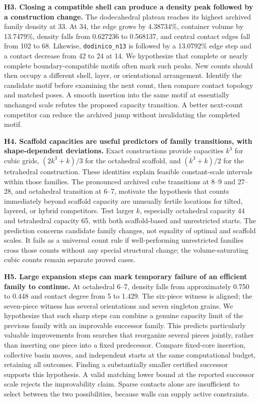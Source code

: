 \documentclass[11pt,a4paper]{article}
\begin{document}
\textbf{H3. Closing a compatible shell can produce a density peak followed by a construction change.} The dodecahedral plateau reaches its highest archived family density at 33. At 34, the edge grows by 4.38734\%, container volume by 13.7479\%, density falls from 0.627236 to 0.568137, and central contact edges fall from 102 to 68. Likewise, \nolinkurl{dodinico_n13} is followed by a 13.0792\% edge step and a contact decrease from 42 to 24 at 14. We hypothesize that complete or nearly complete boundary-compatible motifs often mark such peaks. New counts should then occupy a different shell, layer, or orientational arrangement. Identify the candidate motif before examining the next count, then compare contact topology and matched poses. A smooth insertion into the same motif at essentially unchanged scale refutes the proposed capacity transition. A better next-count competitor can reduce the archived jump without invalidating the completed motif.

\textbf{H4. Scaffold capacities are useful predictors of family transitions, with shape-dependent deviations.} Exact constructions provide capacities $k^3$ for cubic grids, $(2k^3+k)/3$ for the octahedral scaffold, and $(k^3+k)/2$ for the tetrahedral construction. These identities explain feasible constant-scale intervals within those families. The pronounced archived cube transitions at 8--9 and 27--28, and octahedral transition at 6--7, motivate the hypothesis that counts immediately beyond scaffold capacity are unusually fertile locations for tilted, layered, or hybrid competitors. Test larger $k$, especially octahedral capacity 44 and tetrahedral capacity 65, with both scaffold-based and unrestricted starts. The prediction concerns candidate family changes, not equality of optimal and scaffold scales. It fails as a universal count rule if well-performing unrestricted families cross those counts without any special structural change; the volume-saturating cubic counts remain separate proved cases.

\textbf{H5. Large expansion steps can mark temporary failure of an efficient family to continue.} At octahedral 6--7, density falls from approximately 0.750 to 0.448 and contact degree from 5 to 1.429. The six-piece witness is aligned; the seven-piece witness has several orientations and seven singleton grains. We hypothesize that such sharp steps can combine a genuine capacity limit of the previous family with an improvable successor family. This predicts particularly valuable improvements from searches that reorganize several pieces jointly, rather than inserting one piece into a fixed predecessor. Compare fixed-core insertion, collective basin moves, and independent starts at the same computational budget, retaining all outcomes. Finding a substantially smaller certified successor supports this hypothesis. A valid matching lower bound at the reported successor scale rejects the improvability claim. Sparse contacts alone are insufficient to select between the two possibilities, because walls can supply active constraints.
\end{document}
